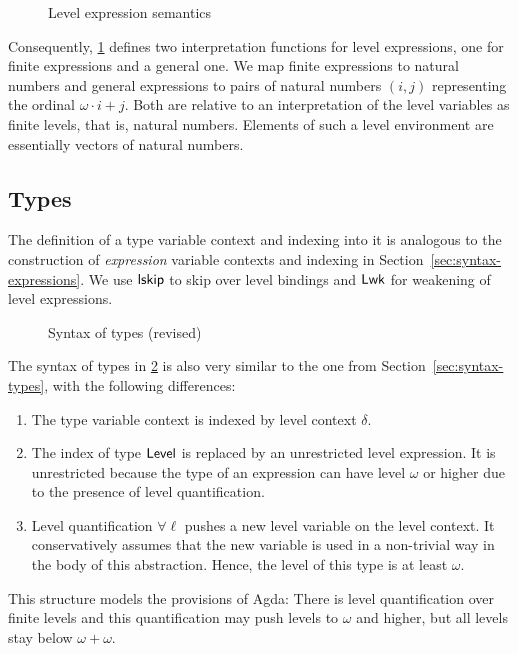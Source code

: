 \documentclass[manuscript,screen,review,anonymous]{acmart}
\begin{document}
\begin{figure}[tp]
  \begin{minipage}{0.45\linewidth}
    \IRLSemFin
  \end{minipage}
  \begin{minipage}{0.45\linewidth}
    \IRLSemAny
  \end{minipage}
  \caption{Level expression semantics}
  \label{fig:ir-semantics-level-expressions}
\end{figure}
Consequently, \cref{fig:ir-semantics-level-expressions} defines two interpretation functions for level
expressions, one for finite expressions and a general one. We map
finite expressions to natural numbers and general expressions to pairs of natural numbers $(i, j)$
representing the ordinal $\omega\cdot i + j$. 
Both are relative to an interpretation  of the level variables as
finite levels, that is, natural numbers. Elements of such a level
environment are essentially vectors of natural numbers.

\IRLEnvSem

\subsection{Types}
\label{sec:types}

The definition of a type variable context and indexing into it is
analogous to the construction of \emph{expression} variable contexts
and indexing in Section~\ref{sec:syntax-expressions}.  We use $\Alskip$ to skip
over level bindings and $\ALwk$ for weakening of level expressions.

\begin{minipage}{0.45\linewidth}
  \IRTEnv
\end{minipage}
\begin{minipage}{0.45\linewidth}
  \IRTEnvNi
\end{minipage}
\begin{figure}[tp]
  \IRType
  \caption{Syntax of types (revised)}
  \label{fig:ir-type-syntax}
\end{figure}

The syntax of types in \cref{fig:ir-type-syntax} is also very similar to the one from
Section~\ref{sec:syntax-types}, with the following differences:
\begin{enumerate}
\item The type variable context is indexed by level context $\delta$.
\item The index of type $\ALevel$ is replaced by an unrestricted level
  expression. It is unrestricted because the type of an expression can
  have level $\omega$ or higher due to the presence of level
  quantification.
\item Level quantification $\forall\ell$ pushes a new level variable on
  the level context. It conservatively assumes that the new variable
  is used in a non-trivial way in the body of this abstraction. Hence,
  the level of this type is at least $\omega$.
\end{enumerate}
This structure models the provisions of Agda: There is level
quantification over finite levels and this quantification may push
levels to $\omega$ and higher, but all levels stay below $\omega+\omega$.
\end{document}
